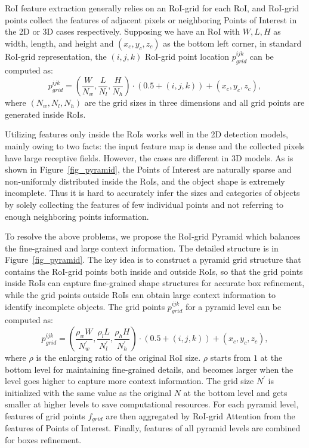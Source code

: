\documentclass[10pt,twocolumn,letterpaper]{article}
\begin{document}
RoI feature extraction generally relies on an RoI-grid for each RoI, and RoI-grid points collect the features of adjacent pixels or neighboring Points of Interest in the 2D or 3D cases respectively. Supposing we have an RoI with $W, L, H$ as width, length, and height and $(x_{c}, y_{c}, z_{c})$ as the bottom left corner, in standard RoI-grid representation, the $(i,j,k)$ RoI-grid point location $p^{ijk}_{grid}$ can be computed as:
\begin{equation}
    p^{ijk}_{grid} = (\frac{W}{N_{w}}, \frac{L}{N_{l}}, \frac{H}{N_{h}}) \cdot (0.5 + (i, j, k)) + (x_{c}, y_{c}, z_{c}),    
\end{equation}
where $(N_{w}, N_{l}, N_{h})$ are the grid sizes in three dimensions and all grid points are generated inside RoIs. 

Utilizing features only inside the RoIs works well in the 2D detection models, mainly owing to two facts: the input feature map is dense and the collected pixels have large receptive fields. However, the cases are different in 3D models. As is shown in Figure~\ref{fig_pyramid}, the Points of Interest are naturally sparse and non-uniformly distributed inside the RoIs, and the object shape is extremely incomplete. Thus it is hard to accurately infer the sizes and categories of objects by solely collecting the features of few individual points and not referring to enough neighboring points information. 

To resolve the above problems, we propose the RoI-grid Pyramid which balances the fine-grained and large context information. The detailed structure is in Figure~\ref{fig_pyramid}. The key idea is to construct a pyramid grid structure that contains the RoI-grid points both inside and outside RoIs, so that the grid points inside RoIs can capture fine-grained shape structures for accurate box refinement, while the grid points outside RoIs can obtain large context information to identify incomplete objects. The grid points $p^{ijk}_{grid}$ for a pyramid level can be computed as:
\begin{equation}
    p^{ijk}_{grid} = (\frac{\rho_{w}W}{N_{w}^{\prime}}, \frac{\rho_{l}L}{N^{\prime}_{l}}, \frac{\rho_{h}H}{N^{\prime}_{h}}) \cdot (0.5 + (i, j, k)) + (x_{c}, y_{c}, z_{c}),
\end{equation}
where $\rho$ is the enlarging ratio of the original RoI size. $\rho$ starts from $1$ at the bottom level for maintaining fine-grained details, and becomes larger when the level goes higher to capture more context information. The grid size $N^{\prime}$ is initialized with the same value as the original $N$ at the bottom level and gets smaller at higher levels to save computational resources. For each pyramid level, features of grid points $f_{grid}$ are then aggregated by RoI-grid Attention from the features of Points of Interest. Finally, features of all pyramid levels are combined for boxes refinement. 
\end{document}
